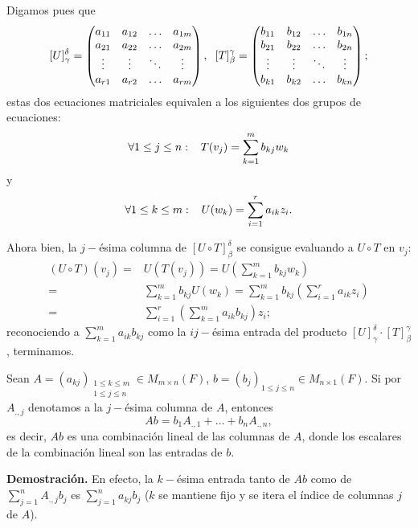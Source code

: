 Digamos pues que
\[
[U]_{\gamma}^{\delta} = 
\begin{pmatrix}
a_{11} & a_{12} & \ldots & a_{1m} \\
a_{21} & a_{22} & \ldots & a_{2m} \\
\vdots & \vdots & \ddots & \vdots \\
a_{r1} & a_{r2} & \ldots & a_{rm}
\end{pmatrix},
\hspace{0.2cm}
[T]_{\beta}^{\gamma} = 
\begin{pmatrix}
b_{11} & b_{12} & \ldots & b_{1n} \\
b_{21} & b_{22} & \ldots & b_{2n} \\
\vdots & \vdots & \ddots & \vdots \\
b_{k1} & b_{k2} & \ldots & b_{kn}
\end{pmatrix};
\]
estas dos ecuaciones matriciales equivalen a los siguientes
dos grupos de ecuaciones: 
\[
\forall 1 \leq j \leq n: \hspace{0.3cm}
T(v_{j}) = \sum_{k = 1}^{m} b_{kj} w_{k}
\]
y
\[
\forall 1 \leq k \leq m: \hspace{0.3cm}
U(w_{k}) = \sum_{i= 1}^{r} a_{ik} z_{i}.
\]

Ahora bien, la $j-$ésima columna de $[U \circ T]_{\beta}^{\delta}$
se consigue evaluando a $U \circ T$ en $v_{j}$:
\begin{align*}
(U \circ T)(v_{j}) = & U (T(v_{j})) = 
U\left( \sum_{k=1}^{m} b_{kj} w_{k} \right) \\
= & \sum_{k=1}^{m} b_{kj} U(w_{k}) = 
\sum_{k=1}^{m} b_{kj} \left( \sum_{i=1}^{r} a_{ik} z_{i} \right) \\
= & \sum_{i=1}^{r} \left( \sum_{k=1}^{m} a_{ik} b_{kj} \right) z_{i};
\end{align*}
reconociendo a $\sum_{k=1}^{m} a_{ik} b_{kj}$ como la $ij-$ésima
entrada del producto 
$[U]_{\gamma}^{\delta} \cdot  
[T]_{\beta}^{\gamma}$, terminamos.

\QEDB
\vspace{0.2cm}

\begin{lema}
	\label{lema: Ab como comb lineal de vectores col de A}
Sean $A = (a_{kj})_{\substack{ 1 \leq k \leq m \\ 1 \leq j \leq n }}
\in M_{m \times n} (F)$, $b = (b_{j})_{1 \leq j \leq n} \in M_{n \times 1}(F)$.
Si por $A_{., j}$ denotamos a la $j-$ésima columna de $A$, entonces
\begin{equation}
	\label{eq: Ab como comb lineal de vectores col de A}
	Ab = b_{1} A_{., 1} + \ldots + b_{n} A_{., n}, 
\end{equation}
es decir, $Ab$ es una combinación lineal de las columnas de $A$, 
donde los escalares de la combinación lineal son las entradas de $b$.
\end{lema}
\noindent
\textbf{Demostración.}
En efecto, la $k-$ésima entrada tanto de $Ab$ como de 
$\sum_{j = 1}^{n} A_{., j} b_{j}$
es $\sum_{j = 1}^{n}a_{kj}b_{j}$ ($k$ se mantiene fijo y se itera
el índice de columnas $j$ de $A$).

